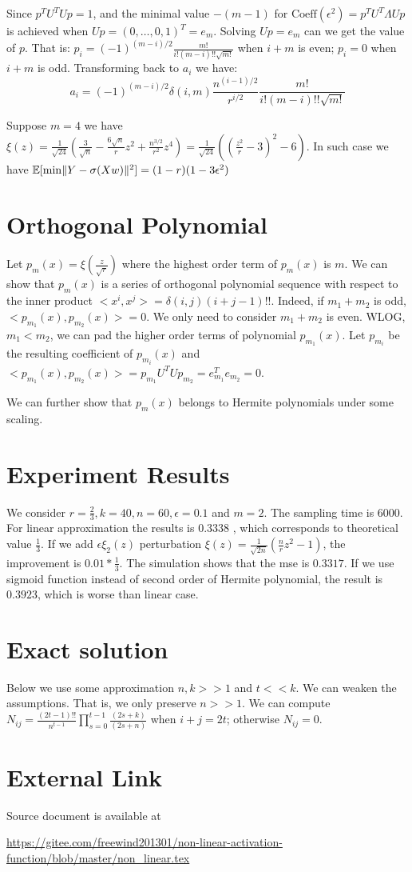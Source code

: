 \documentclass{article}
\DeclarePairedDelimiter\norm{\lVert}{\rVert}
\def\E{\mathbb{E}}
\begin{document}
Since $p^T U^T U p = 1$, and the minimal value $-(m-1)$ for $\textrm{Coeff}(\epsilon^2) = p^T U^T \Lambda U p $ is achieved when $U p = (0, \dots, 0, 1)^T = e_m$. Solving $ U p = e_m $ can we get the value of $p$. That is: $p_i = (-1)^{(m-i)/2} \frac{m!}{i!(m-i)!! \sqrt{m!}} $ when $i+m$ is even; $p_i = 0 $ when $i+m$ is odd. Transforming back to $a_i$ we have:
\begin{equation}
a_i =(-1)^{(m-i)/2} \delta(i,m) \frac{n^{(i-1)/2}}{r^{i/2}} \frac{m!}{i!(m-i)!! \sqrt{m!}}
\end{equation}

Suppose  $ m = 4$ we have $ \xi(z) = \frac{1}{\sqrt{24}}(\frac{3}{\sqrt{n}} - \frac{6\sqrt{n}}{r} z^2 + \frac{n^{3/2}}{r^2}z^4)  = \frac{1}{\sqrt{24}}((\frac{z^2}{r} - 3)^2 - 6)$. In such case we have $\E[\min \norm{Y - \sigma(Xw)}^2]=(1-r)(1-3\epsilon^2)$
\section{Orthogonal Polynomial}
Let $p_m(x) = \xi(\frac{z}{\sqrt{r}})$ where the highest order term of $p_m(x)$ is $m$. We can show that $p_m(x)$ is a series of orthogonal polynomial sequence with respect to the inner product 
$<x^i, x^j> = \delta(i,j)(i+j-1)!!$. Indeed, if $m_1 + m_2$ is odd, $<p_{m_1}(x), p_{m_2}(x)> = 0$.
We only need to consider $m_1 + m_2$ is even. WLOG, $m_1 < m_2$, we can pad the higher order terms of polynomial $p_{m_1}(x)$. Let $p_{m_i}$ be the resulting coefficient of $p_{m_i}(x)$
and $<p_{m_1}(x), p_{m_2}(x)> = p_{m_1}U^TUp_{m_2} = e^T_{m_1} e_{m_2} = 0$.

We can further show that $p_m(x)$ belongs to Hermite polynomials under some scaling.

\section{Experiment Results}
We consider $r=\frac{2}{3}, k=40, n=60, \epsilon=0.1$ and $m=2$. The sampling time is 6000.
For linear approximation the results is $0.3338$ ,  which corresponds to theoretical value $\frac{1}{3}$. 
If we add $\epsilon \xi_2(z)$ perturbation $\xi(z) = \frac{1}{\sqrt{2n}}(\frac{n}{r} z^2 -1)$, the improvement is $0.01 * \frac{1}{3}$. The simulation shows that the mse is $0.3317$. If we use sigmoid function instead of second order of Hermite polynomial, the result is $0.3923$, which is worse than linear case.

\section{Exact solution}
Below we use some approximation $n, k >> 1$ and $ t << k$. 
We can weaken the assumptions. That is, we only preserve $ n >> 1$.
We can compute $N_{ij} =\frac{(2t-1)!!}{n^{t-1}} \prod_{s=0}^{t-1} \frac{(2s+k)}{(2s+n)}$ when $i+j = 2t$; otherwise $N_{ij}=0$.
\section{External Link}
Source document is available at 

\url{https://gitee.com/freewind201301/non-linear-activation-function/blob/master/non_linear.tex}
\end{document}
